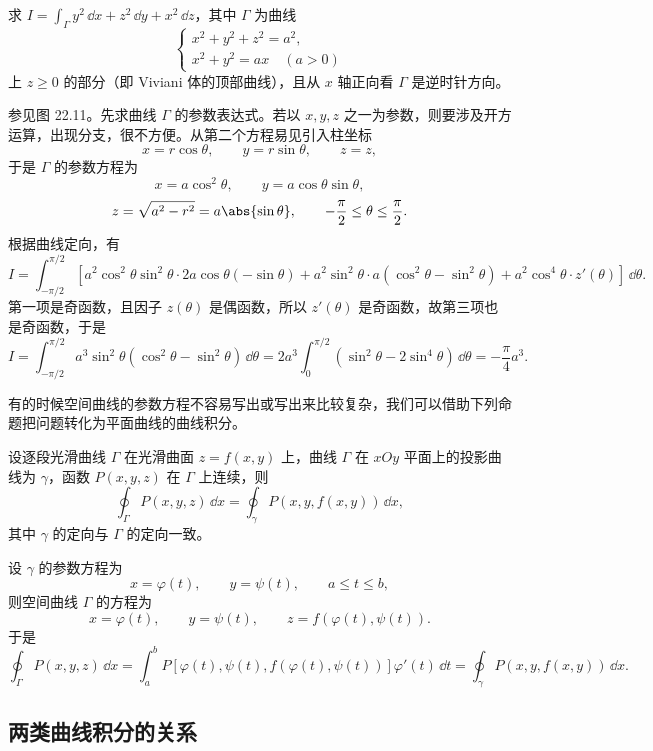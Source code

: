 \begin{xexample}[24.2.2]
求 $I=\displaystyle\int_\Gamma y^2\,\dd x+z^2\,\dd y+x^2\,\dd z$，其中 $\Gamma$ 为曲线
\[
  \begin{cases}
    x^2+y^2+z^2=a^2,\\
    x^2+y^2=ax\quad(a>0)
  \end{cases}
\]
上 $z\ge0$ 的部分（即 Viviani 体的顶部曲线），且从 $x$ 轴正向看 $\Gamma$ 是逆时针方向。
\end{xexample}
\begin{xsolution}
参见图 22.11。先求曲线 $\Gamma$ 的参数表达式。若以 $x,y,z$ 之一为参数，则要涉及开方运算，出现分支，很不方便。从第二个方程易见引入柱坐标
\[
  x=r\cos\theta,\qquad y=r\sin\theta,\qquad z=z,
\]
于是 $\Gamma$ 的参数方程为
\[
  x=a\cos^2\theta,\qquad y=a\cos\theta\sin\theta,
\]
\[
  z=\sqrt{a^2-r^2}=a\abs{\sin\theta},\qquad -\frac\pi2\le\theta\le\frac\pi2.
\]
根据曲线定向，有
\[
  I=\int_{-\pi/2}^{\pi/2}\left[a^2\cos^2\theta\sin^2\theta\cdot2a\cos\theta(-\sin\theta)+a^2\sin^2\theta\cdot a(\cos^2\theta-\sin^2\theta)+a^2\cos^4\theta\cdot z'(\theta)\right]\,\dd\theta.
\]
第一项是奇函数，且因子 $z(\theta)$ 是偶函数，所以 $z'(\theta)$ 是奇函数，故第三项也是奇函数，于是
\[
  I=\int_{-\pi/2}^{\pi/2}a^3\sin^2\theta(\cos^2\theta-\sin^2\theta)\,\dd\theta
  =2a^3\int_0^{\pi/2}(\sin^2\theta-2\sin^4\theta)\,\dd\theta=-\frac\pi4a^3.
\]
\end{xsolution}

有的时候空间曲线的参数方程不容易写出或写出来比较复杂，我们可以借助下列命题把问题转化为平面曲线的曲线积分。

\begin{xproposition}[24.2.1]
设逐段光滑曲线 $\Gamma$ 在光滑曲面 $z=f(x,y)$ 上，曲线 $\Gamma$ 在 $xOy$ 平面上的投影曲线为 $\gamma$，函数 $P(x,y,z)$ 在 $\Gamma$ 上连续，则
\[
  \oint_\Gamma P(x,y,z)\,\dd x=\oint_\gamma P(x,y,f(x,y))\,\dd x,
\]
其中 $\gamma$ 的定向与 $\Gamma$ 的定向一致。
\end{xproposition}
\begin{xproof}
设 $\gamma$ 的参数方程为
\[
  x=\varphi(t),\qquad y=\psi(t),\qquad a\le t\le b,
\]
则空间曲线 $\Gamma$ 的方程为
\[
  x=\varphi(t),\qquad y=\psi(t),\qquad z=f(\varphi(t),\psi(t)).
\]
于是
\[
  \oint_\Gamma P(x,y,z)\,\dd x=\int_a^bP[\varphi(t),\psi(t),f(\varphi(t),\psi(t))]\varphi'(t)\,\dd t
  =\oint_\gamma P(x,y,f(x,y))\,\dd x.
\]
\end{xproof}

\subsection{两类曲线积分的关系}

